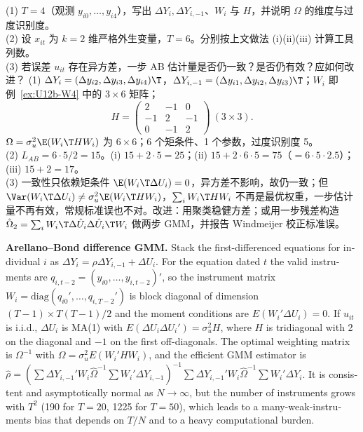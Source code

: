\begin{prac}\label{pr:U12b-ab}
(1) $T=4$（观测 $y_{i0},\dots,y_{i4}$），写出 $\Delta Y_i,\Delta Y_{i,-1}$、$W_i$ 与 $H$，并说明 $\Omega$ 的维度与过度识别度。\\
(2) 设 $x_{it}$ 为 $k=2$ 维严格外生变量，$T=6$。分别按上文做法 (i)(ii)(iii) 计算工具列数。\\
(3) 若误差 $u_{it}$ 存在异方差，一步 AB 估计量是否仍一致？是否仍有效？应如何改进？
\answer
(1) $\Delta Y_i=(\Delta y_{i2},\Delta y_{i3},\Delta y_{i4})\T$，$\Delta Y_{i,-1}=(\Delta y_{i1},\Delta y_{i2},\Delta y_{i3})\T$；$W_i$ 即例~\ref{ex:U12b-W4} 中的 $3\times6$ 矩阵；
\[
H=\begin{pmatrix}2 & -1 & 0\\ -1 & 2 & -1\\ 0 & -1 & 2\end{pmatrix}\ (3\times3).
\]
$\Omega=\sigma_u^2\E(W_i\T HW_i)$ 为 $6\times6$；6 个矩条件、1 个参数，过度识别度 5。\\
(2) $L_{AB}=6\cdot5/2=15$。(i) $15+2\cdot5=25$；(ii) $15+2\cdot6\cdot5=75$（$=6\cdot5\cdot2.5$）；(iii) $15+2=17$。\\
(3) 一致性只依赖矩条件 $\E(W_i\T\Delta U_i)=0$，异方差不影响，故仍一致；但 $\Var(W_i\T\Delta U_i)\neq\sigma_u^2\E(W_i\T HW_i)$，$\sum_iW_i\T HW_i$ 不再是最优权重，一步估计量不再有效，常规标准误也不对。改进：用聚类稳健方差；或用一步残差构造 $\hat\Omega_2=\sum_iW_i\T\Delta\hat U_i\Delta\hat U_i\T W_i$ 做两步 GMM，并报告 Windmeijer 校正标准误。
\end{prac}

\begin{english}
\textbf{Arellano--Bond difference GMM.} Stack the first-differenced equations for individual $i$ as $\Delta Y_i=\rho\Delta Y_{i,-1}+\Delta U_i$. For the equation dated $t$ the valid instruments are $q_{i,t-2}=(y_{i0},\dots,y_{i,t-2})'$, so the instrument matrix $W_i=\mathrm{diag}(q_{i0}',\dots,q_{i,T-2}')$ is block diagonal of dimension $(T-1)\times T(T-1)/2$ and the moment conditions are $E(W_i'\Delta U_i)=0$. If $u_{it}$ is i.i.d., $\Delta U_i$ is MA(1) with $E(\Delta U_i\Delta U_i')=\sigma_u^2H$, where $H$ is tridiagonal with 2 on the diagonal and $-1$ on the first off-diagonals. The optimal weighting matrix is $\Omega^{-1}$ with $\Omega=\sigma_u^2E(W_i'HW_i)$, and the efficient GMM estimator is $\hat\rho=(\sum\Delta Y_{i,-1}'W_i\hat\Omega^{-1}\sum W_i'\Delta Y_{i,-1})^{-1}\sum\Delta Y_{i,-1}'W_i\hat\Omega^{-1}\sum W_i'\Delta Y_i$. It is consistent and asymptotically normal as $N\to\infty$, but the number of instruments grows with $T^2$ (190 for $T=20$, 1225 for $T=50$), which leads to a many-weak-instruments bias that depends on $T/N$ and to a heavy computational burden.
\end{english}

